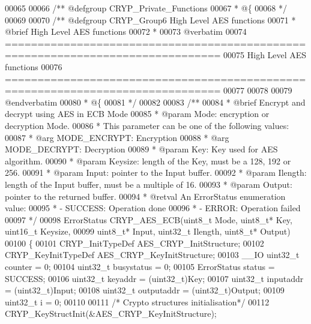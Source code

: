 \begin{DoxyCode}
00065 
00066 \textcolor{comment}{/** @defgroup CRYP\_Private\_Functions}
00067 \textcolor{comment}{  * @\{}
00068 \textcolor{comment}{  */}
00069 
00070 \textcolor{comment}{/** @defgroup CRYP\_Group6 High Level AES functions}
00071 \textcolor{comment}{ *  @brief   High Level AES functions }
00072 \textcolor{comment}{ *}
00073 \textcolor{comment}{@verbatim   }
00074 \textcolor{comment}{ ===============================================================================}
00075 \textcolor{comment}{                          High Level AES functions}
00076 \textcolor{comment}{ ===============================================================================}
00077 \textcolor{comment}{}
00078 \textcolor{comment}{}
00079 \textcolor{comment}{@endverbatim}
00080 \textcolor{comment}{  * @\{}
00081 \textcolor{comment}{  */}
00082 
00083 \textcolor{comment}{/**}
00084 \textcolor{comment}{  * @brief  Encrypt and decrypt using AES in ECB Mode}
00085 \textcolor{comment}{  * @param  Mode: encryption or decryption Mode.}
00086 \textcolor{comment}{  *          This parameter can be one of the following values:}
00087 \textcolor{comment}{  *            @arg MODE\_ENCRYPT: Encryption}
00088 \textcolor{comment}{  *            @arg MODE\_DECRYPT: Decryption}
00089 \textcolor{comment}{  * @param  Key: Key used for AES algorithm.}
00090 \textcolor{comment}{  * @param  Keysize: length of the Key, must be a 128, 192 or 256.}
00091 \textcolor{comment}{  * @param  Input: pointer to the Input buffer.}
00092 \textcolor{comment}{  * @param  Ilength: length of the Input buffer, must be a multiple of 16.}
00093 \textcolor{comment}{  * @param  Output: pointer to the returned buffer.}
00094 \textcolor{comment}{  * @retval An ErrorStatus enumeration value:}
00095 \textcolor{comment}{  *          - SUCCESS: Operation done}
00096 \textcolor{comment}{  *          - ERROR: Operation failed}
00097 \textcolor{comment}{  */}
00098 ErrorStatus CRYP_AES_ECB(uint8\_t Mode, uint8\_t* Key, uint16\_t Keysize,
00099                          uint8\_t* Input, uint32\_t Ilength, uint8\_t* Output)
00100 \{
00101   CRYP\_InitTypeDef AES\_CRYP\_InitStructure;
00102   CRYP\_KeyInitTypeDef AES\_CRYP\_KeyInitStructure;
00103   \_\_IO uint32\_t counter = 0;
00104   uint32\_t busystatus = 0;
00105   ErrorStatus status = SUCCESS;
00106   uint32\_t keyaddr    = (uint32\_t)Key;
00107   uint32\_t inputaddr  = (uint32\_t)Input;
00108   uint32\_t outputaddr = (uint32\_t)Output;
00109   uint32\_t i = 0;
00110 
00111   \textcolor{comment}{/* Crypto structures initialisation*/}
00112   CRYP_KeyStructInit(&AES\_CRYP\_KeyInitStructure);

\end{DoxyCode}
